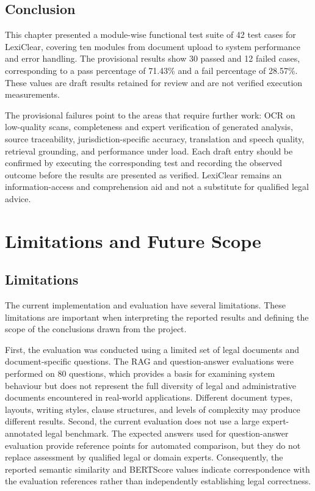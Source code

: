 \documentclass[12pt,a4paper,oneside]{report}
\begin{document}
\section{Conclusion}
This chapter presented a module-wise functional test suite of 42 test cases for LexiClear, covering ten modules from document upload to system performance and error handling. The provisional results show 30 passed and 12 failed cases, corresponding to a pass percentage of 71.43\% and a fail percentage of 28.57\%. These values are draft results retained for review and are not verified execution measurements.

The provisional failures point to the areas that require further work: OCR on low-quality scans, completeness and expert verification of generated analysis, source traceability, jurisdiction-specific accuracy, translation and speech quality, retrieval grounding, and performance under load. Each draft entry should be confirmed by executing the corresponding test and recording the observed outcome before the results are presented as verified. LexiClear remains an information-access and comprehension aid and not a substitute for qualified legal advice.



\chapter{Limitations and Future Scope}

\section{Limitations}
The current implementation and evaluation have several limitations. These limitations are important when interpreting the reported results and defining the scope of the conclusions drawn from the project.

First, the evaluation was conducted using a limited set of legal documents and document-specific questions. The RAG and question-answer evaluations were performed on 80 questions, which provides a basis for examining system behaviour but does not represent the full diversity of legal and administrative documents encountered in real-world applications. Different document types, layouts, writing styles, clause structures, and levels of complexity may produce different results. Second, the current evaluation does not use a large expert-annotated legal benchmark. The expected answers used for question-answer evaluation provide reference points for automated comparison, but they do not replace assessment by qualified legal or domain experts. Consequently, the reported semantic similarity and BERTScore values indicate correspondence with the evaluation references rather than independently establishing legal correctness.
\end{document}
